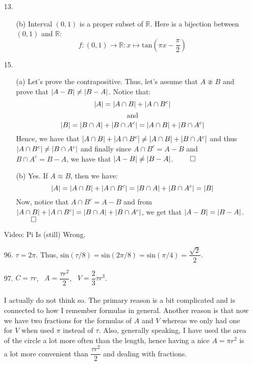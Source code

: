 \documentclass[12pt, a4paper]{article}
\newcommand{\reals}{\mathbb{R}}
\DeclarePairedDelimiter\abs{\lvert}{\rvert}
\newcommand{\rarr}{\rightarrow}
\begin{document}
\begin{itemize}
\item[]

\item[13.]
\begin{itemize}
\item[(b)]
Interval $(0, 1)$ is a proper subset of $\reals$. Here is a bijection between $(0, 1)$ and $\reals$:
$$f : (0, 1) \rarr \reals : x \mapsto \mbox{tan}(\pi x - \dfrac{\pi}{2})$$
\end{itemize}

\item[15.]
\begin{itemize}
\item[(a)]
Let's prove the contrapositive. Thus, let's assume that $A \not \approx B$ and prove that
$\abs{A - B} \neq \abs{B - A}$. Notice that:
$$\abs{A} = \abs{A \cap B} + \abs{A \cap B^c}$$
$$\mbox{and}$$
$$\abs{B} = \abs{B \cap A}+\abs{B \cap A^c} = \abs{A \cap B}+\abs{B \cap A^c}$$
Hence, we have that $\abs{A \cap B} + \abs{A \cap B^c} \neq \abs{A \cap B}+\abs{B \cap A^c}$
and thus $\abs{A \cap B^c} \neq \abs{B \cap A^c}$ and finally since $A \cap B^c = A - B$ and $B \cap A^c = B - A$,
we have that $\abs{A - B} \neq \abs{B - A}$.
$\qed$
\item[(b)]
Yes. If $A \approx B$, then we have:
$$\abs{A} = \abs{A \cap B} + \abs{A \cap B^c} = \abs{B \cap A}+\abs{B \cap A^c} = \abs{B}$$
Now, notice that $A \cap B^c = A - B$ and from $\abs{A \cap B} + \abs{A \cap B^c} = \abs{B \cap A}+\abs{B \cap A^c}$,
we get that $\abs{A - B} = \abs{B - A}$.
$\qed$
\end{itemize}

\item[]
\item[]

{\Large Video: Pi Is (still) Wrong.}
\item[96.]
$\tau = 2\pi$. Thus, $\mbox{sin}(\tau / 8) = \mbox{sin}(2\pi / 8) = \mbox{sin}(\pi / 4) = \dfrac{\sqrt{2}}{2}$.
\item[97.]
$C = \tau r$, \ $A = \dfrac{\tau r^2}{2}$, \ $V = \dfrac{2}{3}\tau r^3$.\\\\
I actually do not think so. The primary reason is a bit complicated and is connected to how I remember formulas in general.
Another reason is that now we have two fractions for the formulas of $A$ and $V$ whereas we only had one for $V$ when used $\pi$
instead of $\tau$. Also, generally speaking, I have used the area of the circle a lot more often than the length, hence having a nice
$A = \pi r^2$ is a lot more convenient than $\dfrac{\tau r^2}{2}$ and dealing with fractions.
\end{itemize}
\end{document}
